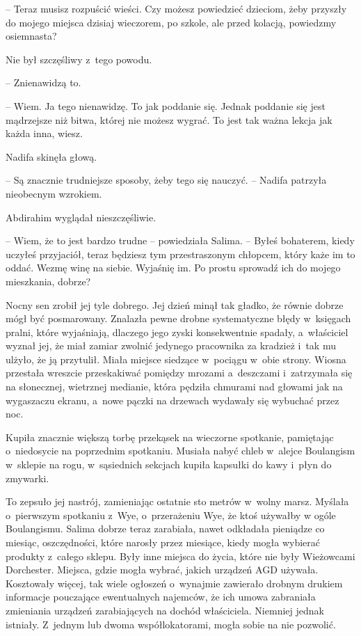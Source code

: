 \documentclass[oneside,polish,11pt,sfheadings]{mwbk}
\begin{document}
-- Teraz musisz rozpuścić wieści. Czy możesz powiedzieć dzieciom, żeby
przyszły do mojego miejsca dzisiaj wieczorem, po szkole, ale przed
kolacją, powiedzmy osiemnasta?

Nie był szczęśliwy z~tego powodu. 

-- Znienawidzą to.

-- Wiem. Ja tego nienawidzę. To jak poddanie się. Jednak poddanie się
jest mądrzejsze niż bitwa, której nie możesz wygrać. To jest tak ważna
lekcja jak każda inna, wiesz.

Nadifa skinęła głową. 

-- Są znacznie trudniejsze sposoby, żeby tego się
nauczyć. -- Nadifa patrzyła nieobecnym wzrokiem.

Abdirahim wyglądał nieszczęśliwie.

-- Wiem, że to jest bardzo trudne -- powiedziała Salima. -- Byłeś
bohaterem, kiedy uczyłeś przyjaciół, teraz będziesz tym przestraszonym
chłopcem, który każe im to oddać. Wezmę winę na siebie. Wyjaśnię im. Po
prostu sprowadź ich do mojego mieszkania, dobrze?

Nocny sen zrobił jej tyle dobrego. Jej dzień minął tak gładko, że równie
dobrze mógł być posmarowany. Znalazła pewne drobne systematyczne błędy w~księgach pralni, które wyjaśniają, dlaczego jego zyski konsekwentnie
spadały, a~właściciel wyznał jej, że miał zamiar zwolnić jedynego
pracownika za kradzież i~tak mu ulżyło, że ją przytulił. Miała miejsce
siedzące w~pociągu w~obie strony. Wiosna przestała wreszcie przeskakiwać
pomiędzy mrozami a~deszczami i~zatrzymała się na słonecznej, wietrznej
medianie, która pędziła chmurami nad głowami jak na wygaszaczu ekranu, a~nowe pączki na drzewach wydawały się wybuchać przez noc.

Kupiła znacznie większą torbę przekąsek na wieczorne spotkanie,
pamiętając o~niedosycie na poprzednim spotkaniu. Musiała nabyć chleb w~alejce Boulangism w~sklepie na rogu, w~sąsiednich sekcjach kupiła
kapsułki do kawy i~płyn do zmywarki.

To zepsuło jej nastrój, zamieniając ostatnie sto metrów w~wolny marsz.
Myślała o~pierwszym spotkaniu z~Wye, o~przerażeniu Wye, że ktoś używałby
w ogóle Boulangismu. Salima dobrze teraz zarabiała, nawet odkładała
pieniądze co miesiąc, oszczędności, które narosły przez miesiące, kiedy
mogła wybierać produkty z~całego sklepu. Były inne miejsca do życia,
które nie były Wieżowcami Dorchester. Miejsca, gdzie mogła wybrać,
jakich urządzeń AGD używała. Kosztowały więcej, tak wiele ogłoszeń o~wynajmie zawierało drobnym drukiem informacje pouczające ewentualnych
najemców, że ich umowa zabraniała zmieniania urządzeń zarabiających na
dochód właściciela. Niemniej jednak istniały. Z~jednym lub dwoma
współlokatorami, mogła sobie na nie pozwolić.
\end{document}
